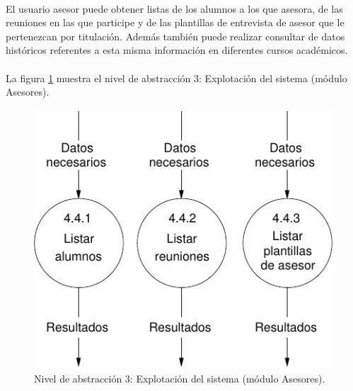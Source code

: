 \paragraph{}El usuario asesor puede obtener listas de los alumnos a los que
asesora, de las reuniones en las que participe y de las plantillas de entrevista
de asesor que le pertenezcan por titulación. Además también puede realizar
consultar de datos históricos referentes a esta misma información en diferentes
cursos académicos.

\paragraph{}La figura \ref{diagramaNivel3-ExplotacionSistema-asesores}
muestra el nivel de abstracción 3: Explotación del sistema (módulo Asesores).

  \begin{figure}[!ht]
    \begin{center}
      \includegraphics[]{08.Analisis_Funcional/8.2.DFDs/Niveles/Nivel3/Asesores/ExplotacionSistema/Diagramas/nivel3-ExplotacionSistema.pdf}
      \caption{Nivel de abstracción 3: Explotación del sistema (módulo Asesores).}
      \label{diagramaNivel3-ExplotacionSistema-asesores}
    \end{center}
  \end{figure}
